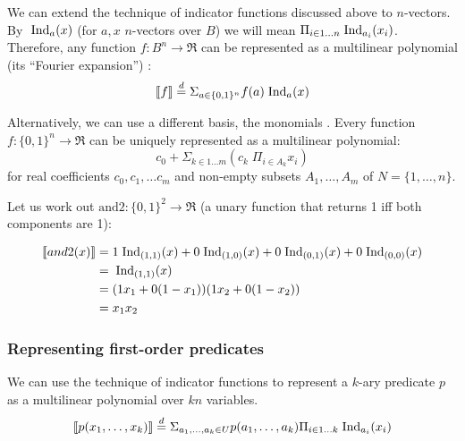 \documentclass{article} %
\def\withmath#1{\relax\ifmmode#1\else{$ #1 $}\fi}
\def\defeq{\withmath{\stackrel{d}{=}}}
\begin{document}
We can extend the technique of indicator functions discussed above to $n$-vectors. By $\;\mbox{Ind}_a(x)$ (for $a,x$ $n$-vectors over \(B\)) we will mean \(\Pi_{i   \in 1\ldots n} \;\mbox{Ind}_{a_i}(x_i)\).  Therefore, any function \(f:B^n \rightarrow \Re\) can be represented as a multilinear polynomial (its ``Fourier expansion'') \cite{boolean-function}: 
\begin{equation}\label{eqn:fourier-expansion}
\LL{f} \defeq \Sigma_{a \in \{0,1\}^n} f(a)\Ind_{a}(x)
\end{equation}


Alternatively, we can use a different basis, the monomials \cite{PB-optimization}. Every
function $f:\{0,1\}^n \rightarrow \Re$ can be uniquely represented as a multilinear polynomial: 
$$ c_0 + \Sigma_{k \in 1\ldots m} (c_k\; \Pi_{i \in A_k} x_i)$$
\noindent for real coefficients $c_0, c_1, \ldots c_m$ and non-empty subsets $A_1, \ldots, A_m$ of $N = \{1, \ldots, n\}$. 

\begin{example}
Let us work out $\mbox{and2}: \{0,1\}^2 \rightarrow \Re$ (a unary function that returns 1 iff both components are 1):

\begin{align*}
\llbracket and2(x) \rrbracket  &= 1 \;\mbox{Ind}_{(1,1)}(x) + 0\;\mbox{Ind}_{(1,0)}(x) + 0\;\mbox{Ind}_{(0,1)}(x) + 0\;\mbox{Ind}_{(0,0)}(x)\\
&= \;\mbox{Ind}_{(1,1)}(x) \\
&= (1  x_1+0(1-x_1))(1  x_2+0(1-x_2))\\
  &=x_1 x_2 
\end{align*}
\end{example}

\subsubsection{Representing first-order predicates}
We can use the technique of indicator functions to represent a $k$-ary predicate $p$ as a multilinear polynomial over \(kn\) variables. 
\begin{equation}
\LL{p(x_1,\ldots, x_k)} \defeq \Sigma_{a_1,\ldots,a_k \in U} p(a_1, \ldots, a_k) \mtimes \Pi_{i \in 1\ldots k} \Ind_{a_i}(x_i)  
\end{equation}

\end{document}
